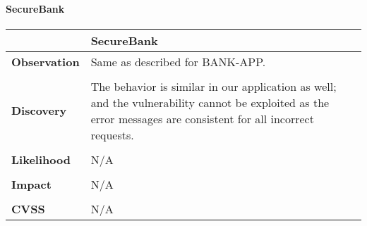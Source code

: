 \paragraph{SecureBank} \mbox{}
\begin{longtable*}{p{.20\textwidth} | p{.80\textwidth}}
    \hline
    & \textbf{SecureBank} \\
    \hline
    \textbf{Observation} &
       Same as described for BANK-APP.
    \\\\
    \textbf{Discovery} &
    The behavior is similar in our application as well; and the vulnerability cannot be exploited as the error messages are consistent for all incorrect requests.
    \\\\
    \textbf{Likelihood} &
        N/A
    \\\\
    \textbf{Impact} &
        N/A
    \\\\
    \textbf{CVSS} &
        N/A
    \\
    \hline
\end{longtable*}
\clearpage